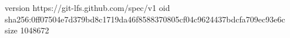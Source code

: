 version https://git-lfs.github.com/spec/v1
oid sha256:0ff07504e7d379bd8c1719da46f8588370805cf04c9624437bdcfa709ec93e6c
size 1048672
